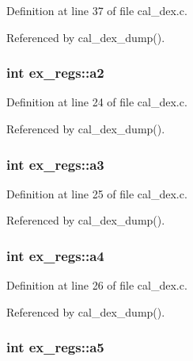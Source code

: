 Definition at line 37 of file cal\-\_\-dex.\-c.



Referenced by cal\-\_\-dex\-\_\-dump().

\hypertarget{structex__regs_a26e59e49025e70d6d9aaaf96a3f4df53}{
\subsubsection[{a2}]{\setlength{\rightskip}{0pt plus 5cm}int ex\-\_\-regs\-::a2}}\label{structex__regs_a26e59e49025e70d6d9aaaf96a3f4df53}


Definition at line 24 of file cal\-\_\-dex.\-c.



Referenced by cal\-\_\-dex\-\_\-dump().

\hypertarget{structex__regs_ab71b2779966288ee152a7b7ca30241f2}{
\subsubsection[{a3}]{\setlength{\rightskip}{0pt plus 5cm}int ex\-\_\-regs\-::a3}}\label{structex__regs_ab71b2779966288ee152a7b7ca30241f2}


Definition at line 25 of file cal\-\_\-dex.\-c.



Referenced by cal\-\_\-dex\-\_\-dump().

\hypertarget{structex__regs_aa2b0ed69fb75ee2b8384b5b975737c64}{
\subsubsection[{a4}]{\setlength{\rightskip}{0pt plus 5cm}int ex\-\_\-regs\-::a4}}\label{structex__regs_aa2b0ed69fb75ee2b8384b5b975737c64}


Definition at line 26 of file cal\-\_\-dex.\-c.



Referenced by cal\-\_\-dex\-\_\-dump().

\hypertarget{structex__regs_a8d6ecd5647dd5921c86b70c3db095d15}{
\subsubsection[{a5}]{\setlength{\rightskip}{0pt plus 5cm}int ex\-\_\-regs\-::a5}}\label{structex__regs_a8d6ecd5647dd5921c86b70c3db095d15}


